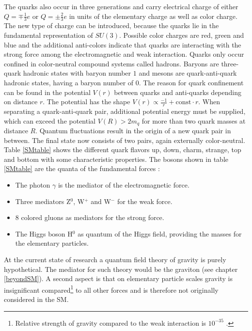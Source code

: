 The quarks also occur in three generations and carry electrical charge of either $Q=\mp\frac13 e$ or $Q=\pm\frac23 e$ in units of the elementary charge as well as color charge. The new type of charge can be introduced, because the quarks lie in the fundamental representation of $SU(3)$. Possible color charges are red, green and blue and the additional anti-colors indicate that quarks are interacting with the strong force among the electromagnetic and weak interaction. \cite{Griffiths} Quarks only occur confined in color-neutral compound systems called hadrons. Baryons are three-quark hadronic states with baryon number $1$ and mesons are quark-anti-quark hadronic states, having a baryon number of $0$. \cite{Cottingham} The reason for quark confinement can be found in the potential $V(r)$ between quarks and anti-quarks depending on distance $r$. The potential has the shape $V(r)\propto\frac{-1}{r}+\text{const}\cdot r$. When separating a quark-anti-quark pair, additional potential energy must be supplied, which can exceed the potential $V(R)>2m_q$ for more than two quark masses at distance $R$. Quantum fluctuations result in the origin of a new quark pair in between. The final state now consists of two pairs, again externally color-neutral. \cite{Nair} Table \ref{SMtable} shows the different quark flavors up, down, charm, strange, top and bottom with some characteristic properties. \newline
The bosons shown in table \ref{SMtable} are the quanta of the fundamental forces \cite{Cottingham}:
\begin{itemize}
\item{The photon $\gamma$ is the mediator of the electromagnetic force.}
\item{Three mediators Z$^0$, W$^+$ and W$^-$ for the weak force.}
\item{$8$ colored gluons as mediators for the strong force.}
\item{The Higgs boson H$^0$ as quantum of the Higgs field, providing the masses for the elementary particles.}
\end{itemize}
At the current state of research a quantum field theory of gravity is purely hypothetical. The mediator for such theory would be the graviton (see chapter \ref{beyondSM}). A second aspect is that on elementary particle scales gravity is insignificant compared\footnote{Relative strength of gravity compared to the weak interaction is $10^{-35}$ \cite{Mann}.} to all other forces and is therefore not originally considered in the SM. \cite{Cottingham}\par
